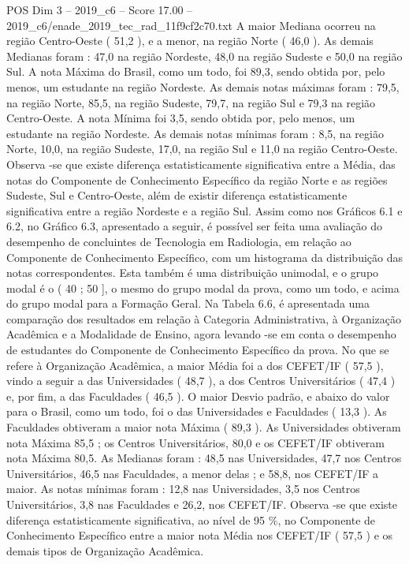 \begin{textsample}{POS Dim 3 – 2019\_c6 – Score 17.00 – 2019\_c6/enade\_2019\_tec\_rad\_11f9cf2c70.txt}
A maior Mediana ocorreu na região Centro-Oeste ( 51,2 ), e a menor, na região Norte ( 46,0 ).
As demais Medianas foram : 47,0 na região Nordeste, 48,0 na região Sudeste e 50,0 na região Sul.
A nota Máxima do Brasil, como um todo, foi 89,3, sendo obtida por, pelo menos, um estudante na região Nordeste.
As demais notas máximas foram : 79,5, na região Norte, 85,5, na região Sudeste, 79,7, na região Sul e 79,3 na região Centro-Oeste.
A nota Mínima foi 3,5, sendo obtida por, pelo menos, um estudante na região Nordeste.
As demais notas mínimas foram : 8,5, na região Norte, 10,0, na região Sudeste, 17,0, na região Sul e 11,0 na região Centro-Oeste.
Observa -se que existe diferença estatisticamente significativa entre a Média, das notas do Componente de Conhecimento Específico da região Norte e as regiões Sudeste, Sul e Centro-Oeste, além de existir diferença estatisticamente significativa entre a região Nordeste e a região Sul.
Assim como nos Gráficos 6.1 e 6.2, no Gráfico 6.3, apresentado a seguir, é possível ser feita uma avaliação do desempenho de concluintes de Tecnologia em Radiologia, em relação ao Componente de Conhecimento Específico, com um histograma da distribuição das notas correspondentes.
Esta também é uma distribuição unimodal, e o grupo modal é o ( 40 ; 50 ], o mesmo do grupo modal da prova, como um todo, e acima do grupo modal para a Formação Geral.
Na Tabela 6.6, é apresentada uma comparação dos resultados em relação à Categoria Administrativa, à Organização Acadêmica e a Modalidade de Ensino, agora levando -se em conta o desempenho de estudantes do Componente de Conhecimento Específico da prova.
No que se refere à Organização Acadêmica, a maior Média foi a dos CEFET/IF ( 57,5 ), vindo a seguir a das Universidades ( 48,7 ), a dos Centros Universitários ( 47,4 ) e, por fim, a das Faculdades ( 46,5 ).
O maior Desvio padrão, e abaixo do valor para o Brasil, como um todo, foi o das Universidades e Faculdades ( 13,3 ).
As Faculdades obtiveram a maior nota Máxima ( 89,3 ).
As Universidades obtiveram nota Máxima 85,5 ; os Centros Universitários, 80,0 e os CEFET/IF obtiveram nota Máxima 80,5.
As Medianas foram : 48,5 nas Universidades, 47,7 nos Centros Universitários, 46,5 nas Faculdades, a menor delas ; e 58,8, nos CEFET/IF a maior.
As notas mínimas foram : 12,8 nas Universidades, 3,5 nos Centros Universitários, 3,8 nas Faculdades e 26,2, nos CEFET/IF.
Observa -se que existe diferença estatisticamente significativa, ao nível de 95 \%, no Componente de Conhecimento Específico entre a maior nota Média nos CEFET/IF ( 57,5 ) e os demais tipos de Organização Acadêmica.

\end{textsample}
